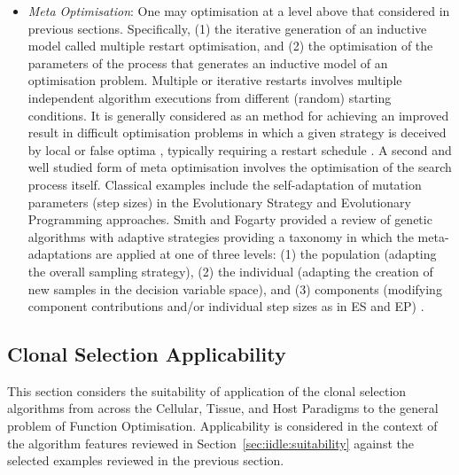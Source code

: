 \begin{itemize}
	\item \emph{Meta Optimisation}: One may optimisation at a level above that considered in previous sections. Specifically, (1) the iterative generation of an inductive model called multiple restart optimisation, and (2) the optimisation of the parameters of the process that generates an inductive model of an optimisation problem. Multiple or iterative restarts involves multiple independent algorithm executions from different (random) starting conditions. It is generally considered as an method for achieving an improved result in difficult optimisation problems in which a given strategy is deceived by local or false optima \cite{Muselli1997, Hu1994}, typically requiring a restart schedule \cite{Fukunaga1998}. A second and well studied form of meta optimisation involves the optimisation of the search process itself. Classical examples include the self-adaptation of mutation parameters (step sizes) in the Evolutionary Strategy \cite{Rechenberg1973, Schwefel1981} and Evolutionary Programming \cite{Fogel1966, Fogel1991} approaches. Smith and Fogarty provided a review of genetic algorithms with adaptive strategies providing a taxonomy in which the meta-adaptations are applied at one of three levels: (1) the population (adapting the overall sampling strategy), (2) the individual (adapting the creation of new samples in the decision variable space), and (3) components (modifying component contributions and/or individual step sizes as in ES and EP) \cite{Smith1997b}.
	
\end{itemize}


%
%
\subsection{Clonal Selection Applicability}
\label{subsec:iidle:function:optimization:applicability}
This section considers the suitability of application of the clonal selection algorithms from across the Cellular, Tissue, and Host Paradigms to the general problem of Function Optimisation. Applicability is considered in the context of the algorithm features reviewed in Section~\ref{sec:iidle:suitability} against the selected examples reviewed in the previous section.

%
%
